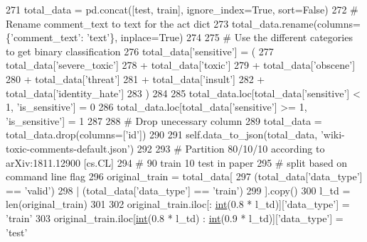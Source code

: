 \begin{DoxyCode}
{271             total\_data = pd.concat([test, train], ignore\_index=\textcolor{keyword}{True}, sort=\textcolor{keyword}{False})
272             \textcolor{comment}{# Rename comment\_text to text for the act dict}
273             total\_data.rename(columns=\{\textcolor{stringliteral}{'comment\_text'}: \textcolor{stringliteral}{'text'}\}, inplace=\textcolor{keyword}{True})
274 
275             \textcolor{comment}{# Use the different categories to get binary classification}
276             total\_data[\textcolor{stringliteral}{'sensitive'}] = (
277                 total\_data[\textcolor{stringliteral}{'severe\_toxic'}]
278                 + total\_data[\textcolor{stringliteral}{'toxic'}]
279                 + total\_data[\textcolor{stringliteral}{'obscene'}]
280                 + total\_data[\textcolor{stringliteral}{'threat'}]
281                 + total\_data[\textcolor{stringliteral}{'insult'}]
282                 + total\_data[\textcolor{stringliteral}{'identity\_hate'}]
283             )
284 
285             total\_data.loc[total\_data[\textcolor{stringliteral}{'sensitive'}] < 1, \textcolor{stringliteral}{'is\_sensitive'}] = 0
286             total\_data.loc[total\_data[\textcolor{stringliteral}{'sensitive'}] >= 1, \textcolor{stringliteral}{'is\_sensitive'}] = 1
287 
288             \textcolor{comment}{# Drop unecessary column}
289             total\_data = total\_data.drop(columns=[\textcolor{stringliteral}{'id'}])
290 
291             self.data\_to\_json(total\_data, \textcolor{stringliteral}{'wiki-toxic-comments-default.json'})
292 
293             \textcolor{comment}{# Partition 80/10/10 according to arXiv:1811.12900 [cs.CL]}
294             \textcolor{comment}{# 90 train 10 test in paper}
295             \textcolor{comment}{# split based on command line flag}
296             original\_train = total\_data[
297                 (total\_data[\textcolor{stringliteral}{'data\_type'}] == \textcolor{stringliteral}{'valid'})
298                 | (total\_data[\textcolor{stringliteral}{'data\_type'}] == \textcolor{stringliteral}{'train'})
299             ].copy()
300             l\_td = len(original\_train)
301 
302             original\_train.iloc[: \hyperlink{namespacelanguage__model_1_1eval__ppl_a7d12ee00479673c5c8d1f6d01faa272a}{int}(0.8 * l\_td)][\textcolor{stringliteral}{'data\_type'}] = \textcolor{stringliteral}{'train'}
303             original\_train.iloc[\hyperlink{namespacelanguage__model_1_1eval__ppl_a7d12ee00479673c5c8d1f6d01faa272a}{int}(0.8 * l\_td) : \hyperlink{namespacelanguage__model_1_1eval__ppl_a7d12ee00479673c5c8d1f6d01faa272a}{int}(0.9 * l\_td)][\textcolor{stringliteral}{'data\_type'}] = \textcolor{stringliteral}{'test'}
}
\end{DoxyCode}
